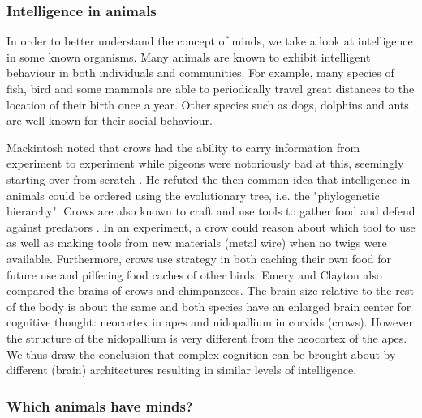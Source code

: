 \documentclass[11pt]{article}
\newenvironment{draft}{\color{dark-cornflower-blue-2}}{\ignorespacesafterend}
\begin{document}
\subsubsection*{Intelligence in animals}

\begin{draft}

In order to better understand the concept of minds, we take a look at intelligence in some known organisms. 
Many animals are known to exhibit intelligent behaviour in both individuals and communities. For example, many species of fish, bird and some mammals are able to periodically travel great distances to the location of their birth once a year. Other species such as dogs, dolphins and ants are well known for their social behaviour.

Mackintosh noted that crows had the ability to carry information from experiment to experiment while pigeons were notoriously bad at this, seemingly starting over from scratch \cite{mackintosh1988animals}. He refuted the then common idea that intelligence in animals could be ordered using the evolutionary tree, i.e. the "phylogenetic hierarchy". 
Crows are also known to craft and use tools to gather food and defend against predators \cite{emery2004crows}. In an experiment, a crow could reason about which tool to use as well as making tools from new materials (metal wire) when no twigs were available.
Furthermore, crows use strategy in both caching their own food for future use and pilfering food caches of other birds. 
Emery and Clayton also compared the brains of crows and chimpanzees.
The brain size relative to the rest of the body is about the same and both species have an enlarged brain center for cognitive thought: neocortex in apes and nidopallium in corvids (crows). However the structure of the nidopallium is very different from the neocortex of the apes. We thus draw the conclusion that complex cognition can be brought about by different (brain) architectures resulting in similar levels of intelligence.

\subsubsection*{Which animals have minds?}


\end{draft}
\end{document}
